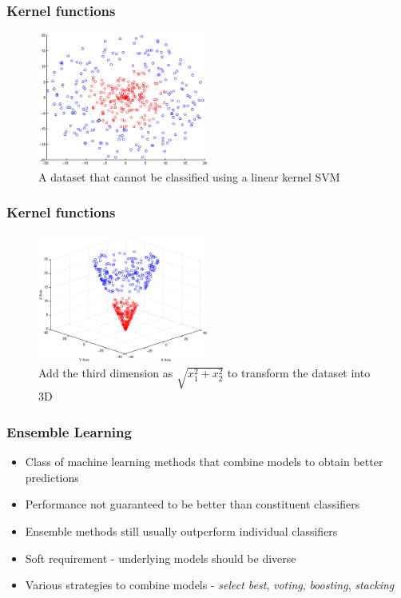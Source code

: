 \documentclass[9pt]{beamer}
\begin{document}
    \begin{frame}
        \frametitle{Kernel functions}
        \begin{figure}
            \centering
            \includegraphics[width=0.5\textwidth]{figures/svm_non_linear_data.eps}
            \caption{A dataset that cannot be classified using a linear kernel SVM}
        \end{figure}
    \end{frame}
    
    \begin{frame}
        \frametitle{Kernel functions}
        \begin{figure}
            \centering
            \includegraphics[width=0.5\textwidth]{figures/svm_non_linear_data_3d.eps}
            \caption{Add the third dimension as $\sqrt{x_1^2 + x_2^2}$ to transform the dataset into 3D}
        \end{figure}
    \end{frame}
    
    \begin{frame}
        \frametitle{Ensemble Learning}
        \begin{itemize}
            \item{Class of machine learning methods that combine models to obtain better predictions}
            \item{Performance not guaranteed to be better than constituent classifiers}
            \item{Ensemble methods still usually outperform individual classifiers}
            \item{Soft requirement - underlying models should be diverse}
            \item{Various strategies to combine models - \emph{select best}, \emph{voting}, \emph{boosting}, \emph{stacking}}
        \end{itemize}
    \end{frame}
    
\end{document}
